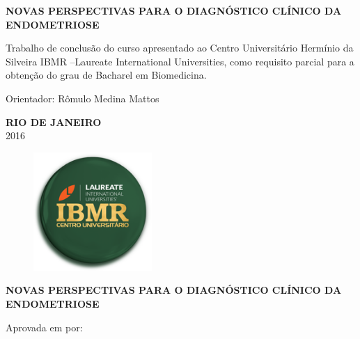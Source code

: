 \documentclass[12pt]{article} %
\begin{document}
\begin{center}
\MakeUppercase{\textbf{Novas perspectivas para o diagnóstico clínico da endometriose}}
\end{center}

\vspace{4.5cm}
Trabalho de conclusão do curso apresentado ao Centro Universitário Hermínio da Silveira IBMR  –Laureate International Universities, como requisito parcial para a obtenção do grau de Bacharel em Biomedicina.

\vspace{2.5cm}

\theauthor

\vspace{2.5cm}

Orientador: Rômulo Medina Mattos

\vspace{2.0cm}
\begin{center}
\MakeUppercase{\textbf{Rio de Janeiro}}\\
2016
\end{center}

\newpage


\begin{figure}[h!]
\centering
\includegraphics[width=4.5cm]{ibmr.png}
\end{figure}


\begin{center}
\MakeUppercase{\theauthor}
\end{center}

\vspace{2.0cm}

\begin{center}
\MakeUppercase{\textbf{Novas perspectivas para o diagnóstico clínico da endometriose}}
\end{center}

\vspace{2.0cm}

Aprovada em  por:

\vspace{9.0cm}
\end{document}
